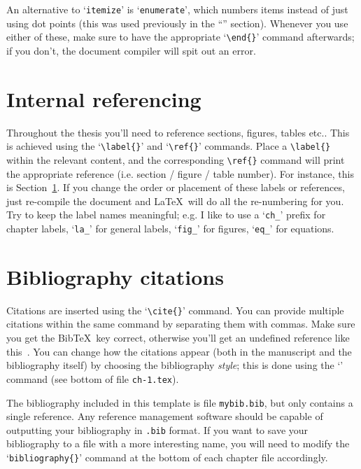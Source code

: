 An alternative to `\verb+itemize+' is `\verb+enumerate+', which numbers items instead of just using dot points (this was used previously in the ``'' section). Whenever you use either of these, make sure to have the appropriate `\verb+\end{}+' command afterwards; if you don't, the document compiler will spit out an error.
%
%
\section{Internal referencing}
\label{la_referencing}

Throughout the thesis you'll need to reference sections, figures, tables etc.. This is achieved using the `\verb+\label{}+' and `\verb+\ref{}+' commands. Place a \verb+\label{}+ within the relevant content, and the corresponding \verb+\ref{}+ command will print the appropriate reference (i.e. section / figure / table number). For instance, this is Section~\ref{la_referencing}. If you change the order or placement of these labels or references, just re-compile the document and \LaTeX~will do all the re-numbering for you. Try to keep the label names meaningful; e.g. I like to use a `\verb+ch_+' prefix for chapter labels, `\verb+la_+' for general labels, `\verb+fig_+' for figures, `\verb+eq_+' for equations.
%
%
\section{Bibliography citations}
\label{la_citations}

Citations are inserted using the `\verb+\cite{}+' command. You can provide multiple citations within the same command by separating them with commas. Make sure you get the Bib\TeX~key correct, otherwise you'll get an undefined reference like this~\cite{rumpelstiltskin2013}. You can change how the citations appear (both in the manuscript and the bibliography itself) by choosing the bibliography {\em style}; this is done using the `\verb++' command (see bottom of file \verb+ch-1.tex+).

The bibliography included in this template is file \verb+mybib.bib+, but only contains a single reference. Any reference management software should be capable of outputting your bibliography in \verb+.bib+ format. If you want to save your bibliography to a file with a more interesting name, you will need to modify the `\verb+bibliography{}+' command at the bottom of each chapter file accordingly.

